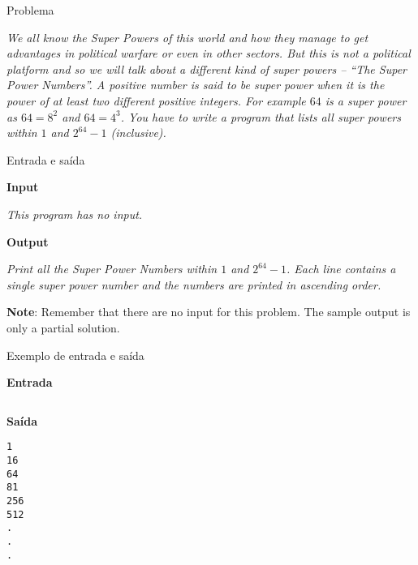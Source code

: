\begin{frame}[fragile]{Problema}

{\it We all know the Super Powers of this world and how they manage to get advantages in political warfare
or even in other sectors. But this is not a political platform and so we will talk about a different kind
of super powers -- ``The Super Power Numbers''. A positive number is said to be super power when it
is the power of at least two different positive integers. For example $64$ is a super power as $64 = 8^2$ and
$64 = 4^3$. You have to write a program that lists all super powers within $1$ and $2^{64} - 1$ (inclusive).}

\end{frame}

\begin{frame}[fragile]{Entrada e saída}

\textbf{Input}

{\it This program has no input.}

\vspace{0.3in}


\textbf{Output}

{\it Print all the Super Power Numbers within $1$ and $2^{64} - 1$. Each line contains a single super power
number and the numbers are printed in ascending order.

\textbf{Note}: Remember that there are no input for this problem. The sample output is only a partial solution.}

\end{frame}

\begin{frame}[fragile]{Exemplo de entrada e saída}

\begin{minipage}[t]{0.45\textwidth}
\textbf{Entrada}
\begin{verbatim}
\end{verbatim}
\end{minipage}
\begin{minipage}[t]{0.5\textwidth}
\textbf{Saída}
\begin{verbatim}
1
16
64
81
256
512
.
.
.
\end{verbatim}
\end{minipage}

\end{frame}

